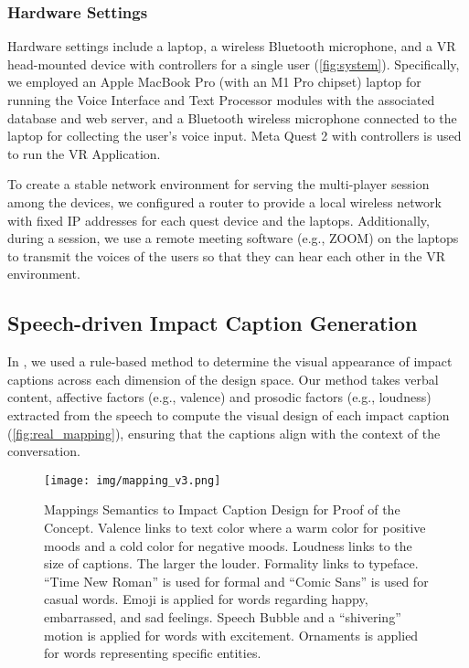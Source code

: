 \subsubsection{Hardware Settings}
\label{sec_hardware}
Hardware settings include a laptop, a wireless Bluetooth microphone, and a VR head-mounted device with controllers for a single user (\autoref{fig:system}). 
Specifically, we employed an Apple MacBook Pro (with an M1 Pro chipset) laptop for running the Voice Interface and Text Processor modules with the associated database and web server, and a Bluetooth wireless microphone connected to the laptop for collecting the user's voice input. Meta Quest 2 with controllers is used to run the \system{} VR Application. 


To create a stable network environment for serving the multi-player session among the devices, we configured a router to provide a local wireless network with fixed IP addresses for each quest device and the laptops. Additionally, during a session, we use a remote meeting software (e.g., ZOOM) on the laptops to transmit the voices of the users so that they can hear each other in the VR environment.


\subsection{Speech-driven Impact Caption Generation}
\label{section_mapping}
In \system{}, we used a rule-based method to determine the visual appearance of impact captions across each dimension of the design space.
Our method takes verbal content, affective factors (e.g., valence) and prosodic factors (e.g., loudness) extracted from the speech to compute the visual design of each impact caption (\autoref{fig:real_mapping}), ensuring that the captions align with the context of the conversation.


\begin{figure*}[!ht]
    \centering
    \texttt{[image: img/mapping\_v3.png]}
    \caption{
        Mappings Semantics to Impact Caption Design for Proof of the Concept.
        Valence links to text color where a warm color for positive moods and a cold color for negative moods.
        Loudness links to the size of captions. The larger the louder. 
        Formality links to typeface. ``Time New Roman'' is used for formal and ``Comic Sans'' is used for casual words.
        Emoji is applied for words regarding happy, embarrassed, and sad feelings.
        Speech Bubble and a ``shivering'' motion is applied for words with excitement.
        Ornaments is applied for words representing specific entities.
    }
    \label{fig:real_mapping}
\end{figure*}

